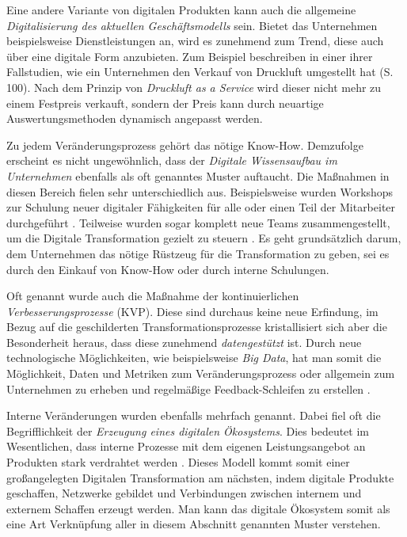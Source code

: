Eine andere Variante von digitalen Produkten kann auch die allgemeine \textit{Digitalisierung des aktuellen Geschäftsmodells} sein. Bietet das Unternehmen beispielsweise Dienstleistungen an, wird es zunehmend zum Trend, diese auch über eine digitale Form anzubieten. Zum Beispiel beschreiben  in einer ihrer Fallstudien, wie ein Unternehmen den Verkauf von Druckluft umgestellt hat (S. 100). Nach dem Prinzip von \textit{Druckluft as a Service} wird dieser nicht mehr zu einem Festpreis verkauft, sondern der Preis kann durch neuartige Auswertungsmethoden dynamisch angepasst werden.

Zu jedem Veränderungsprozess gehört das nötige  Know-How. Demzufolge erscheint es nicht ungewöhnlich, dass der \textit{Digitale Wissensaufbau im Unternehmen} ebenfalls als oft genanntes Muster auftaucht. Die Maßnahmen in diesen Bereich fielen sehr unterschiedlich aus. Beispielsweise wurden Workshops zur Schulung neuer digitaler Fähigkeiten für alle oder einen Teil der Mitarbeiter durchgeführt \cite[S. 177]{gassmann_digitale_2016}. Teilweise wurden sogar komplett neue Teams zusammengestellt, um die Digitale Transformation gezielt zu steuern \cite[S. 139]{urbach_digitalization_2018}. Es geht grundsätzlich darum, dem Unternehmen das nötige Rüstzeug für die Transformation zu geben, sei es durch den Einkauf von Know-How oder durch interne Schulungen.

Oft genannt wurde auch die Maßnahme der kontinuierlichen \textit{Verbesserungsprozesse} (KVP). Diese sind durchaus keine neue Erfindung, im Bezug auf die geschilderten Transformationsprozesse kristallisiert sich  aber die  Besonderheit heraus, dass diese zunehmend \textit{datengestützt} ist. Durch neue technologische Möglichkeiten, wie beispielsweise \textit{Big Data}, hat man somit die Möglichkeit, Daten und Metriken zum Veränderungsprozess oder allgemein zum Unternehmen zu erheben und regelmäßige Feedback-Schleifen zu erstellen \cite[S. 8]{beule_digital_2019}.

Interne Veränderungen wurden ebenfalls mehrfach genannt. Dabei fiel oft die Begrifflichkeit der \textit{Erzeugung eines digitalen Ökosystems}. Dies bedeutet im Wesentlichen, dass interne Prozesse mit dem eigenen Leistungsangebot an Produkten stark verdrahtet werden \cite[S. 127]{heinemann_digitale_2016}. Dieses Modell kommt somit einer großangelegten Digitalen Transformation am nächsten, indem digitale Produkte geschaffen, Netzwerke gebildet und Verbindungen zwischen internem und externem Schaffen erzeugt werden. Man kann das digitale Ökosystem somit als eine Art Verknüpfung aller in diesem Abschnitt genannten Muster verstehen.

